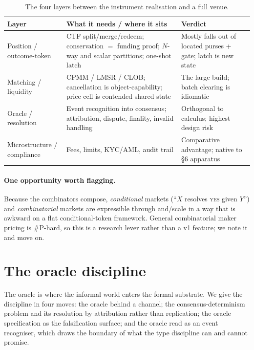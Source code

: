 \documentclass[11pt]{article}
\begin{document}
\begin{table}[t]
\centering\small
\begin{tabular}{@{}p{2.6cm}p{6.4cm}p{4.2cm}@{}}
\toprule
\textbf{Layer} & \textbf{What it needs / where it sits} & \textbf{Verdict} \\
\midrule
Position / outcome-token &
CTF \textsf{split}/\textsf{merge}/\textsf{redeem}; conservation $=$ funding proof; $N$-way
and scalar partitions; one-shot latch &
Mostly falls out of located purses + gate; latch is new state \\[0.4em]
Matching / liquidity &
CPMM / LMSR / CLOB; cancellation is object-capability; price cell is contended shared state &
The large build; batch clearing is idiomatic \\[0.4em]
Oracle / resolution &
Event recognition into consensus; attribution, dispute, finality, invalid handling &
Orthogonal to calculus; highest design risk \\[0.4em]
Microstructure / compliance &
Fees, limits, KYC/AML, audit trail &
Comparative advantage; native to \S6 apparatus \\
\bottomrule
\end{tabular}
\caption{The four layers between the instrument realisation and a full venue.}
\label{tab:gaps}
\end{table}

\paragraph{One opportunity worth flagging.} Because the combinators compose, \emph{conditional}
markets (``$X$ resolves \textsc{yes} given $Y$'') and \emph{combinatorial} markets are
expressible through \textsf{and}/\textsf{scale} in a way that is awkward on a flat
conditional-token framework. General combinatorial maker pricing is \#P-hard, so this is a
research lever rather than a v1 feature; we note it and move on.

\section{The oracle discipline}\label{sec:oracle}

The oracle is where the informal world enters the formal substrate. We give the discipline in
four moves: the oracle behind a channel; the consensus-determinism problem and its resolution
by attribution rather than replication; the oracle specification as the falsification surface;
and the oracle read as an event recogniser, which draws the boundary of what the type
discipline can and cannot promise.
\end{document}
